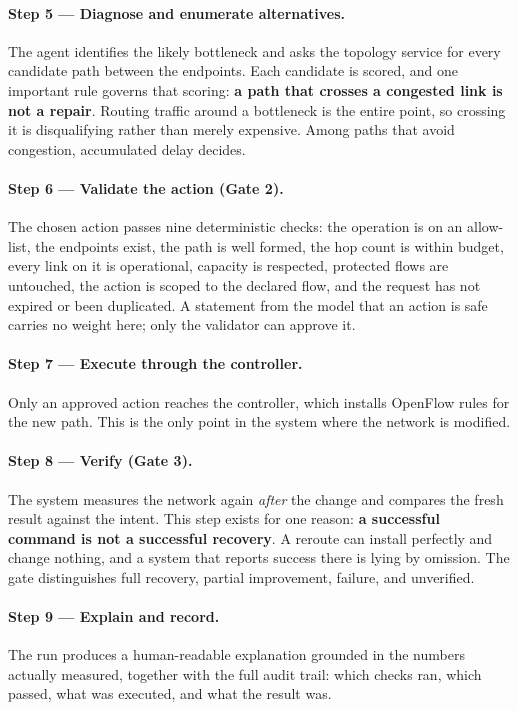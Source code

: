 \documentclass[12pt,a4paper]{report}
\begin{document}
\paragraph{Step 5 --- Diagnose and enumerate alternatives.}
The agent identifies the likely bottleneck and asks the topology service for
every candidate path between the endpoints. Each candidate is scored, and one
important rule governs that scoring: \textbf{a path that crosses a congested
link is not a repair}. Routing traffic around a bottleneck is the entire point,
so crossing it is disqualifying rather than merely expensive. Among paths that
avoid congestion, accumulated delay decides.

\paragraph{Step 6 --- Validate the action (Gate 2).}
The chosen action passes nine deterministic checks: the operation is on an
allow-list, the endpoints exist, the path is well formed, the hop count is
within budget, every link on it is operational, capacity is respected, protected
flows are untouched, the action is scoped to the declared flow, and the request
has not expired or been duplicated. A statement from the model that an action is
safe carries no weight here; only the validator can approve it.

\paragraph{Step 7 --- Execute through the controller.}
Only an approved action reaches the controller, which installs OpenFlow rules for
the new path. This is the only point in the system where the network is
modified.

\paragraph{Step 8 --- Verify (Gate 3).}
The system measures the network again \emph{after} the change and compares the
fresh result against the intent. This step exists for one reason: \textbf{a
successful command is not a successful recovery}. A reroute can install
perfectly and change nothing, and a system that reports success there is lying
by omission. The gate distinguishes full recovery, partial improvement, failure,
and unverified.

\paragraph{Step 9 --- Explain and record.}
The run produces a human-readable explanation grounded in the numbers actually
measured, together with the full audit trail: which checks ran, which passed,
what was executed, and what the result was.
\end{document}
